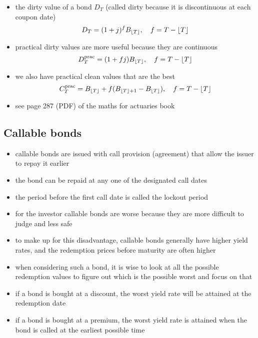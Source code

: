 \documentclass[../00_main.tex]{subfiles}
\begin{document}
\begin{itemize}
    \item the dirty value of a bond $D_T$ (called dirty because it is
        discontinuous at each coupon date)
        \begin{equation}\nonumber
            D_T = (1 + j)^f B_{\floor*{T}}, \quad f = T - \floor*{T}
        \end{equation}
    \item practical dirty values are more useful because they are continuous
        \begin{equation}\nonumber
            D_T^\text{prac} = (1 + fj) B_{\floor*{T}}, \quad f = T - \floor*{T}
        \end{equation}
    \item we also have practical clean values that are the best
        \begin{equation}\nonumber
            C_T^\text{prac} = B_{\floor*{T}} + f(B_{\floor*{T}+1}
            - B_{\floor*{T}}), \quad f = T - \floor*{T}
        \end{equation}
    \item see page 287 (PDF) of the maths for actuaries book
\end{itemize}

\subsection{Callable bonds}

\begin{itemize}
    \item callable bonds are issued with call provision (agreement) that allow
        the issuer to repay it earlier
    \item the bond can be repaid at any one of the designated call dates
    \item the period before the first call date is called the lockout period
    \item for the investor callable bonds are worse because they are more
        difficult to judge and less safe
    \item to make up for this disadvantage, callable bonds generally have
        higher yield rates, and the redemption prices before maturity are often
        higher 
    \item when considering such a bond, it is wise to look at all the possible
        redemption values to figure out which is the possible worst and focus
        on that
    \item if a bond is bought at a discount, the worst yield rate will be
        attained at the redemption date
    \item if a bond is bought at a premium, the worst yield rate is attained
        when the bond is called at the earliest possible time
\end{itemize}
\end{document}
